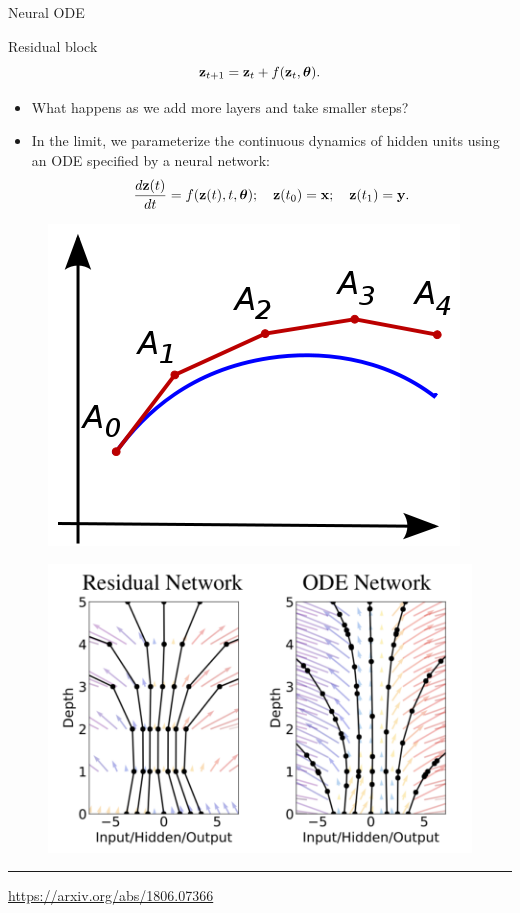 \begin{frame}{Neural ODE}
	\begin{block}{Residual block}
	\vspace{-0.3cm}
	\[
	    \mathbf{z}_{t+1} = \mathbf{z}_t + f(\mathbf{z}_t, \boldsymbol{\theta}).
	\]
	\vspace{-0.4cm}
	\end{block}
	\begin{itemize}
		\item What happens as we add more layers and take smaller steps? \\
		\item In the limit, we parameterize the continuous dynamics of hidden units using an ODE specified by a neural network: 
	\[
	    \frac{d \mathbf{z}(t)}{dt} = f(\mathbf{z}(t), t, \boldsymbol{\theta}); \quad \mathbf{z}(t_0) = \mathbf{x}; \quad \mathbf{z}(t_1) = \mathbf{y}.
	\]
	\end{itemize}
	\begin{minipage}[t]{0.4\columnwidth}
		\begin{figure}
			\centering
			\includegraphics[width=0.9\linewidth]{figs/euler}
		\end{figure}
	\end{minipage}%
	\begin{minipage}[t]{0.6\columnwidth}
		\begin{figure}
			\centering
			\includegraphics[width=0.8\linewidth]{figs/resnet_vs_neural_ode.png}
		\end{figure}
	\end{minipage}
	\hrule\medskip
	{\scriptsize \href{https://arxiv.org/abs/1806.07366}{https://arxiv.org/abs/1806.07366}}   
\end{frame}

